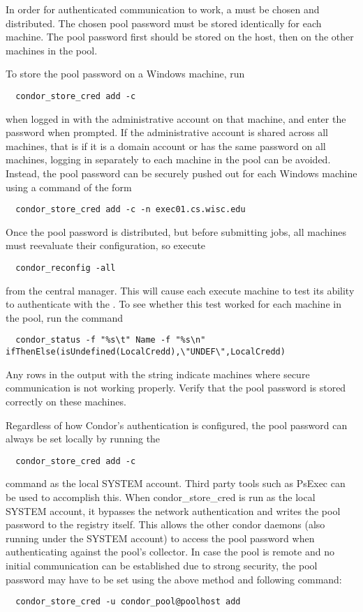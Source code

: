 In order for  authenticated communication to work,
a  must be chosen and distributed.
The chosen pool password must be stored identically for each machine.
The pool password first should be
stored on the  host, then on the other machines in the pool.

To store the pool password on a Windows machine, run
\begin{verbatim}
  condor_store_cred add -c
\end{verbatim}
when logged in with the administrative account on that machine,
and enter the password when prompted. 
If the administrative account is shared across all machines,
that is if it is a domain account or has the same password on all machines,
logging in separately to each machine in the pool can be avoided.
Instead, the pool password can be securely pushed out for each Windows machine
using a command of the form
\begin{verbatim}
  condor_store_cred add -c -n exec01.cs.wisc.edu
\end{verbatim}

Once the pool password is distributed, 
but before submitting jobs,
all machines must reevaluate their configuration,
so execute
\begin{verbatim}
  condor_reconfig -all
\end{verbatim}
from the central manager.
This will cause each execute machine to test its ability
to authenticate with the .
To see whether this test worked for each machine in the pool, run the command
\footnotesize
\begin{verbatim}
  condor_status -f "%s\t" Name -f "%s\n" ifThenElse(isUndefined(LocalCredd),\"UNDEF\",LocalCredd)
\end{verbatim}
\normalsize
Any rows in the output with the  string indicate machines where
secure communication is not working properly. Verify that the pool password
is stored correctly on these machines.

Regardless of how Condor's authentication is configured, the pool password can 
always be set locally by running the 
\begin{verbatim}
  condor_store_cred add -c
\end{verbatim}
command as the local SYSTEM account. Third party tools such as PsExec can be 
used to accomplish this. When condor\_store\_cred is run as the local SYSTEM
account, it bypasses the network authentication and writes the pool password 
to the registry itself. This allows the other condor daemons (also running
under the SYSTEM account) to access the pool password when authenticating
against the pool's collector. 
In case the pool is remote and no initial communication can be established 
due to strong security, the pool password may have to be set using the
above method and following command:
\begin{verbatim}
  condor_store_cred -u condor_pool@poolhost add
\end{verbatim}

